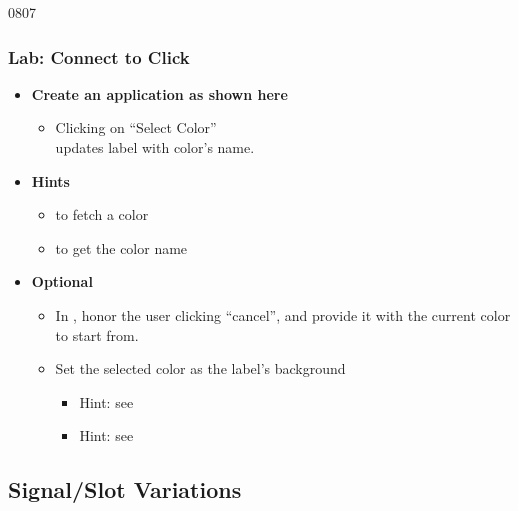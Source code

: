 \begin{slide}[fragile]{0807}
\frametitle{Lab: Connect to Click}
\label{project_signal_slot}
\begin{itemize}
\item \textbf{Create an application as shown here}
  \begin{itemize}
  \item Clicking on ``Select Color'' \\
    updates label with color's name.
  \end{itemize}
\item \textbf{Hints}
  \begin{itemize}
  \item {} to fetch a color
  \item {} to get the color name
 \end{itemize}
\item \textbf{Optional}
  \begin{itemize}
  \item In , honor the user clicking
    ``cancel'', and provide it with the current color to start from.
  \item Set the selected color as the label's background 
    \begin{itemize}
    \item Hint: see 
    \item Hint: see 
    \end{itemize}

  \end{itemize}
\end{itemize}
\vfill
{}
\end{slide}


\subsection{Signal/Slot Variations}

